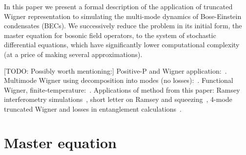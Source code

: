 \documentclass[12pt,aip,jmp,amssymb,amsmath]{revtex4-1}
\begin{document}
In this paper we present a formal description of the application of truncated Wigner representation to simulating the multi-mode dynamics of Bose-Einstein condensates (BECs).
We successively reduce the problem in its initial form, the master equation for bosonic field operators, to the system of stochastic differential equations, which have significantly lower computational complexity (at a price of making several approximations).

[TODO: Possibly worth mentioning:]
Positive-P and Wigner application:~\cite{Deuar2007}.
Multimode Wigner using decomposition into modes (no losses):~\cite{Norrie2005,Norrie2006}.
Functional Wigner, finite-temperature:~\cite{Steel1998,Isella2006}.
Applications of method from this paper: Ramsey interferometry simulations~\cite{Egorov2011}, short letter on Ramsey and squeezing~\cite{Opanchuk2012}, 4-mode truncated Wigner and losses in entanglement calculations~\cite{Opanchuk2012a}.



\section{Master equation}
\end{document}
